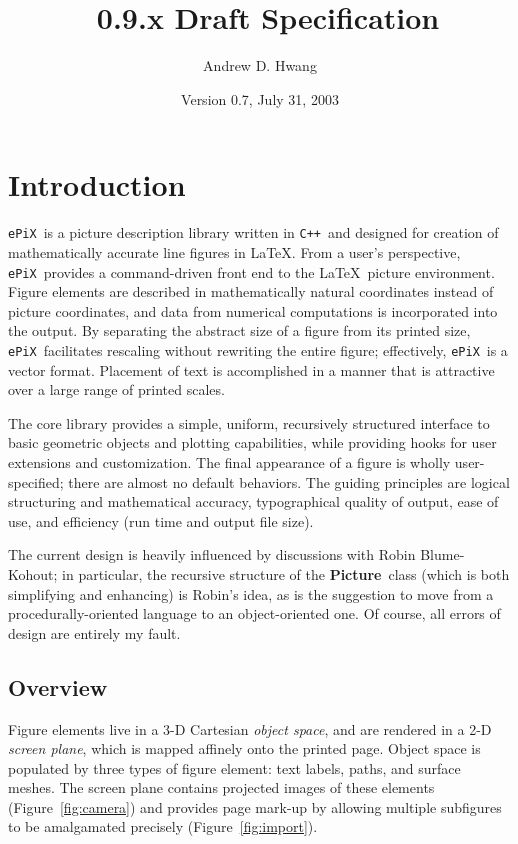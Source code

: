 \documentclass[12pt]{article}
\title{\ePiX~0.9.x Draft Specification}
\author{Andrew D. Hwang}
\date{Version 0.7, July 31, 2003}
\newcommand{\Class}[1]{\textbf{#1}}
\newcommand{\Code}[1]{\texttt{#1}}
\newcommand{\Program}[1]{\texttt{#1}}
\newcommand{\Picture}{\Class{Picture}}
\newcommand{\CXX}{\Code{C++}}
\newcommand{\ePiX}{\Program{ePiX}}
\begin{document}
\maketitle

\section{Introduction}

\ePiX\ is a picture description library written in \CXX\ and designed
for creation of mathematically accurate line figures in \LaTeX. From a
user's perspective, \ePiX\ provides a command-driven front end to the
\LaTeX\ picture environment. Figure elements are described in
mathematically natural coordinates instead of picture coordinates, and
data from numerical computations is incorporated into the output. By
separating the abstract size of a figure from its printed size, \ePiX\ 
facilitates rescaling without rewriting the entire figure;
effectively, \ePiX\ is a vector format. Placement of text is
accomplished in a manner that is attractive over a large range of
printed scales.

The core library provides a simple, uniform, recursively structured
interface to basic geometric objects and plotting capabilities, while
providing hooks for user extensions and customization. The final
appearance of a figure is wholly user-specified; there are almost no
default behaviors. The guiding principles are logical structuring and
mathematical accuracy, typographical quality of output, ease of use,
and efficiency (run time and output file size).

The current design is heavily influenced by discussions with Robin
Blume-Kohout; in particular, the recursive structure of the \Picture\ 
class (which is both simplifying and enhancing) is Robin's idea, as is
the suggestion to move from a procedurally-oriented language to an
object-oriented one. Of course, all errors of design are entirely my
fault.


\subsection{Overview}

Figure elements live in a 3-D Cartesian \emph{object space}, and are
rendered in a 2-D \emph{screen plane}, which is mapped affinely onto
the printed page. Object space is populated by three types of figure
element: text labels, paths, and surface meshes. The screen plane
contains projected images of these elements (Figure~\ref{fig:camera})
and provides page mark-up by allowing multiple subfigures to be
amalgamated precisely (Figure~\ref{fig:import}).
\end{document}

